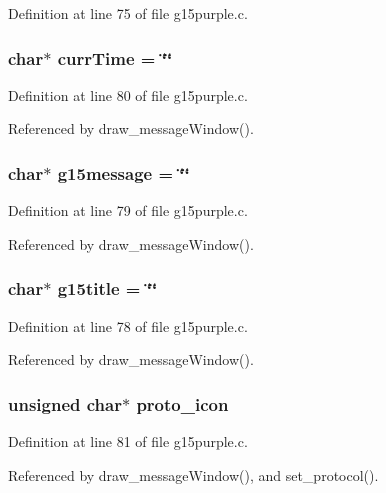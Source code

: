 Definition at line 75 of file g15purple.c.
\subsubsection{\setlength{\rightskip}{0pt plus 5cm}char$\ast$ {\bf currTime} = \char`\"{}\char`\"{}}\label{g15purple_8c_6896f1b7d5ef50ab2de6de030ba2447f}




Definition at line 80 of file g15purple.c.

Referenced by draw\_\-messageWindow().
\subsubsection{\setlength{\rightskip}{0pt plus 5cm}char$\ast$ {\bf g15message} = \char`\"{}\char`\"{}}\label{g15purple_8c_66684ec000a779a7386570b5e748f313}




Definition at line 79 of file g15purple.c.

Referenced by draw\_\-messageWindow().
\subsubsection{\setlength{\rightskip}{0pt plus 5cm}char$\ast$ {\bf g15title} = \char`\"{}\char`\"{}}\label{g15purple_8c_553670eae66d9943a756368a4233b107}




Definition at line 78 of file g15purple.c.

Referenced by draw\_\-messageWindow().
\subsubsection{\setlength{\rightskip}{0pt plus 5cm}unsigned char$\ast$ {\bf proto\_\-icon}}\label{g15purple_8c_3b617682a7431f2cf20e361b89ace171}




Definition at line 81 of file g15purple.c.

Referenced by draw\_\-messageWindow(), and set\_\-protocol().
